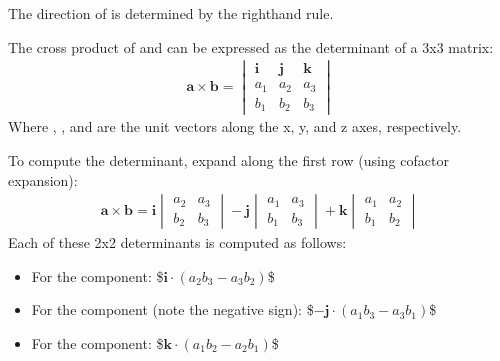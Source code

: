 \documentclass[letterpaper,10pt,english]{jupyterBook}
\begin{document}
\sphinxAtStartPar
The direction of  is determined by the right\sphinxhyphen{}hand rule.

\sphinxAtStartPar
The cross product of  and  can be expressed as the determinant of a 3x3 matrix:
\begin{equation*}
\begin{split}
\mathbf{a} \times \mathbf{b} = \begin{vmatrix}
\mathbf{i} & \mathbf{j} & \mathbf{k} \\
a_1 & a_2 & a_3 \\
b_1 & b_2 & b_3
\end{vmatrix}
\end{split}
\end{equation*}
\sphinxAtStartPar
Where , , and  are the unit vectors along the x, y, and z axes, respectively.

\sphinxAtStartPar
To compute the determinant, expand along the first row (using cofactor expansion):
\begin{equation*}
\begin{split}
\mathbf{a} \times \mathbf{b} =
\mathbf{i} \begin{vmatrix} a_2 & a_3 \\ b_2 & b_3 \end{vmatrix} -
\mathbf{j} \begin{vmatrix} a_1 & a_3 \\ b_1 & b_3 \end{vmatrix} +
\mathbf{k} \begin{vmatrix} a_1 & a_2 \\ b_1 & b_2 \end{vmatrix}
\end{split}
\end{equation*}
\sphinxAtStartPar
Each of these 2x2 determinants is computed as follows:
\begin{itemize}
\item {} 
\sphinxAtStartPar
For the  component:
\$\(
\mathbf{i} \cdot \left( a_2 b_3 - a_3 b_2 \right)
\)\$

\item {} 
\sphinxAtStartPar
For the  component (note the negative sign):
\$\( 
-\mathbf{j} \cdot \left( a_1 b_3 - a_3 b_1 \right)
\)\$

\item {} 
\sphinxAtStartPar
For the  component:
\$\(
\mathbf{k} \cdot \left( a_1 b_2 - a_2 b_1 \right)
\)\$

\end{itemize}
\end{document}
